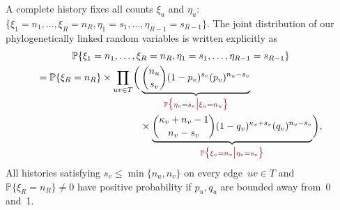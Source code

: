 \documentclass{elsarticle}
\newcommand{\CB}[1]{\textcolor{webbrown}{#1}}
\newcommand{\condgen}[6]{{#1}#2 #5 #3 #6 #4}
\newcommand{\EXP}{\mathbb{E}}
\newcommand{\PROB}{\mathbb{P}}
\newcommand{\Probcsm}[2]{\condgen{\PROB}{\bigl\{}{\bigm|}{\bigr\}}{#1}{#2}}
\newcommand{\Probcmd}[2]{\condgen{\PROB}{\Bigl\{}{\Bigm|}{\Bigr\}}{#1}{#2}}
\newcommand{\Expcmd}[2]{\condgen{\EXP}{\Bigl[}{\Bigm|}{\Bigr]}{#1}{#2}}
\newcommand{\nx}{u}
\newcommand{\ny}{v}
\newcommand{\troot}{R}
\begin{document}
%
%
%
%
%

A complete history 
fixes all counts $\xi_{\nx}$ and $\eta_{\nx}$:
$\{\xi_1=n_1,\dotsc,\xi_{\troot}=n_{\troot}, \eta_1=s_1,\dotsc, \eta_{R-1}=s_{R-1}\}$.
The joint distribution of our 
phylogenetically linked random variables 
is written explicitly as  
\begin{multline}\label{eq:likelihood.history}
\PROB\{\xi_1=n_1,\dotsc,\xi_{\troot}=n_{\troot}, \eta_1=s_1,\dotsc, \eta_{R-1}=s_{R-1}\}
\\
 = 
 \begin{aligned}[t]
 \PROB\{\xi_{\troot}=n_{\troot}\}
 \times 
 \prod_{\nx\ny\in T}
 	\biggl( 
 	& \underbrace{\binom{n_{\nx}}{s_{\ny}} (1-p_{\ny})^{s_{\ny}} (p_{\ny})^{n_{\nx}-s_{\ny}}}_{\CB{\Probcsm{\eta_{\ny}=s_{\ny}}{\xi_{\nx}=n_{\nx}}}}
 	 \\ & \times 
 	\underbrace{\binom{\kappa_{\ny}+n_{\ny}-1}{n_{\ny}-s_{\ny}} (1-q_{\ny})^{\kappa_{\ny}+s_{\ny}} (q_{\ny})^{n_{\ny}-s_{\ny}}}_{\CB{\Probcsm{\xi_{\ny}=n_{\ny}}{\eta_{\ny}=s_{\ny}}}}
 	\biggr),
 \end{aligned}
\end{multline}
All histories satisfying $s_{\ny}\le \min\{n_{\nx},n_{\ny}\}$ 
on every edge~$\nx\ny\in T$ and $\PROB\{\xi_{\troot}=n_{\troot}\}\ne 0$
have positive probability if $p_{\nx},q_{\nx}$ are bounded away from~0 and~1.   
\end{document}
